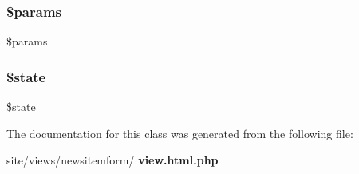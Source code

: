 \subsubsection{\$params}
{\footnotesize\ttfamily \$params\hspace{0.3cm}{\ttfamily [protected]}}

\mbox{\label{classtks__agenda_view_newsitemform_ae82306c4f2d17d8dd5c7d8d916b33bed}} 
\subsubsection{\$state}
{\footnotesize\ttfamily \$state\hspace{0.3cm}{\ttfamily [protected]}}



The documentation for this class was generated from the following file\+:\begin{DoxyCompactItemize}
\item 
site/views/newsitemform/\textbf{ view.\+html.\+php}\end{DoxyCompactItemize}
